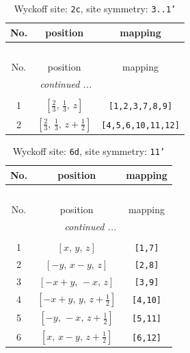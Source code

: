\documentclass[fleqn,8pt]{jsarticle}
\begin{document}
\renewcommand{\arraystretch}{1.2}
\begin{longtable}{ccc}
\caption{Wyckoff site: {\tt 2c}, site symmetry: {\tt 3..1'}}
 \\
 \hline \hline
No. & position & mapping \\ \hline \endfirsthead

\multicolumn{2}{l}{\tablename\ \thetable{}} \\
 \hline \hline
No. & position & mapping \\ \hline \endhead

 \hline \hline
\multicolumn{2}{r}{\footnotesize\it continued ...} \\ \endfoot

 \hline \hline
\multicolumn{2}{r}{} \\ \endlastfoot

1 & $\left[ \frac{2}{3},\, \frac{1}{3},\, z \right]$ & {\tt [1,2,3,7,8,9]} \\ \hline
2 & $\left[ \frac{2}{3},\, \frac{1}{3},\, z + \frac{1}{2} \right]$ & {\tt [4,5,6,10,11,12]} \\
\end{longtable}
\renewcommand{\arraystretch}{1.2}
\begin{longtable}{ccc}
\caption{Wyckoff site: {\tt 6d}, site symmetry: {\tt 11'}}
 \\
 \hline \hline
No. & position & mapping \\ \hline \endfirsthead

\multicolumn{2}{l}{\tablename\ \thetable{}} \\
 \hline \hline
No. & position & mapping \\ \hline \endhead

 \hline \hline
\multicolumn{2}{r}{\footnotesize\it continued ...} \\ \endfoot

 \hline \hline
\multicolumn{2}{r}{} \\ \endlastfoot

1 & $\left[ x,\, y,\, z \right]$ & {\tt [1,7]} \\ \hline
2 & $\left[ - y,\, x - y,\, z \right]$ & {\tt [2,8]} \\ \hline
3 & $\left[ - x + y,\, - x,\, z \right]$ & {\tt [3,9]} \\ \hline
4 & $\left[ - x + y,\, y,\, z + \frac{1}{2} \right]$ & {\tt [4,10]} \\ \hline
5 & $\left[ - y,\, - x,\, z + \frac{1}{2} \right]$ & {\tt [5,11]} \\ \hline
6 & $\left[ x,\, x - y,\, z + \frac{1}{2} \right]$ & {\tt [6,12]} \\
\end{longtable}
\end{document}
